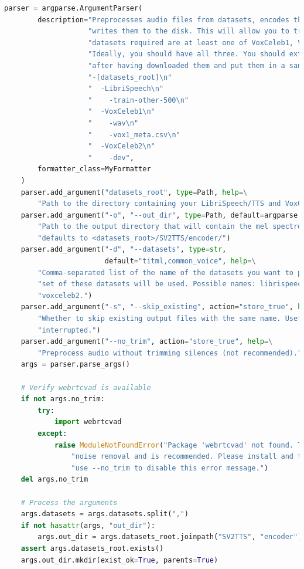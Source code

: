 \begin{enumerate}
\begin{lstlisting}[language=Python, caption=Preprocessing Encoder Model (Pycharm), label=lstencoder]
    parser = argparse.ArgumentParser(
        description="Preprocesses audio files from datasets, encodes them as mel spectrograms and "
                    "writes them to the disk. This will allow you to train the encoder. The "
                    "datasets required are at least one of VoxCeleb1, VoxCeleb2 and LibriSpeech. "
                    "Ideally, you should have all three. You should extract them as they are "
                    "after having downloaded them and put them in a same directory, e.g.:\n"
                    "-[datasets_root]\n"
                    "  -LibriSpeech\n"
                    "    -train-other-500\n"
                    "  -VoxCeleb1\n"
                    "    -wav\n"
                    "    -vox1_meta.csv\n"
                    "  -VoxCeleb2\n"
                    "    -dev",
        formatter_class=MyFormatter
    )
    parser.add_argument("datasets_root", type=Path, help=\
        "Path to the directory containing your LibriSpeech/TTS and VoxCeleb datasets.")
    parser.add_argument("-o", "--out_dir", type=Path, default=argparse.SUPPRESS, help=\
        "Path to the output directory that will contain the mel spectrograms. If left out, "
        "defaults to <datasets_root>/SV2TTS/encoder/")
    parser.add_argument("-d", "--datasets", type=str,
                        default="titml,common_voice", help=\
        "Comma-separated list of the name of the datasets you want to preprocess. Only the train "
        "set of these datasets will be used. Possible names: librispeech_other, voxceleb1, "
        "voxceleb2.")
    parser.add_argument("-s", "--skip_existing", action="store_true", help=\
        "Whether to skip existing output files with the same name. Useful if this script was "
        "interrupted.")
    parser.add_argument("--no_trim", action="store_true", help=\
        "Preprocess audio without trimming silences (not recommended).")
    args = parser.parse_args()

    # Verify webrtcvad is available
    if not args.no_trim:
        try:
            import webrtcvad
        except:
            raise ModuleNotFoundError("Package 'webrtcvad' not found. This package enables "
                "noise removal and is recommended. Please install and try again. If installation fails, "
                "use --no_trim to disable this error message.")
    del args.no_trim

    # Process the arguments
    args.datasets = args.datasets.split(",")
    if not hasattr(args, "out_dir"):
        args.out_dir = args.datasets_root.joinpath("SV2TTS", "encoder")
    assert args.datasets_root.exists()
    args.out_dir.mkdir(exist_ok=True, parents=True)


\end{lstlisting}
\end{enumerate}
